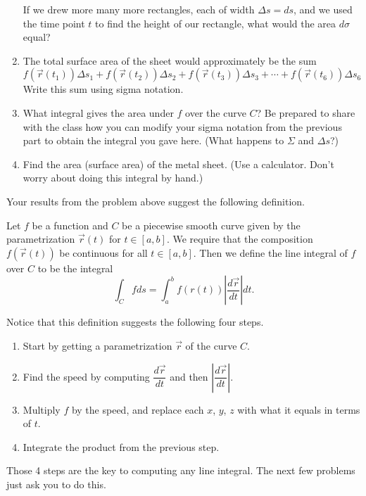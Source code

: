 \begin{problem}
\begin{enumerate}
If we drew more many more rectangles, each of width $\Delta s=ds$, and we used the time point $t$ to find the height of our rectangle, what would the area $d\sigma$ equal?

 \item The total surface area of the sheet would approximately be the sum
$$
f(\vec r(t_1))\Delta s_1+
f(\vec r(t_2))\Delta s_2+
f(\vec r(t_3))\Delta s_3+\cdots+
f(\vec r(t_6))\Delta s_6
$$
Write this sum using sigma notation. 
\item What integral gives the area under $f$ over the curve $C$? Be prepared to share with the class how you can modify your sigma notation from the previous part to obtain the integral you gave here. (What happens to $\Sigma$ and $\Delta s$?)
\item Find the area (surface area) of the metal sheet. (Use a calculator. Don't worry about doing this integral by hand.)
\end{enumerate}
\end{problem}

Your results from the problem above suggest the following definition.
\begin{definition}%
 Let $f$ be a function and $C$ be a piecewise smooth curve given by the parametrization $\vec r(t)$ for $t\in[a,b]$. We require that the composition $f(\vec r(t))$ be continuous for all $t\in [a,b]$. Then we define the line integral
of $f$ over $C$ to be the integral 
$$\int_C f ds = \int_a^b f(r(t))\left|\frac{d\vec r}{dt}\right|dt.$$
\end{definition}

Notice that this definition suggests the following four steps.
\begin{enumerate}
 \item Start by getting a parametrization $\vec r$ of the curve $C$. 
 \item Find the speed by computing $\dfrac{d\vec r}{dt}$ and then $\left|\dfrac{d\vec r}{dt}\right|$.
 \item Multiply $f$ by the speed, and replace each $x$, $y$, $z$ with what it equals in terms of $t$.
 \item Integrate the product from the previous step.
\end{enumerate}
Those 4 steps are the key to computing any line integral.  The next few problems just ask you to do this.

